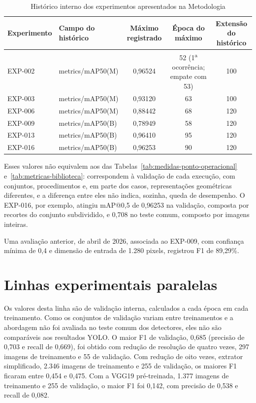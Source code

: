 \begin{table}[htb]
\centering
\caption{Hist\'orico interno dos experimentos apresentados na Metodologia}
\label{tab:historico-interno}
\small
\begin{tabular}{lp{3.2cm}ccc}
\hline
\textbf{Experimento} & \textbf{Campo do hist\'orico} & \textbf{M\'aximo registrado} & \textbf{\'Epoca do m\'aximo} & \textbf{Extens\~ao do hist\'orico} \\
\hline
EXP-002 & metrics/mAP50(M) & 0,96524 & 52 (1\textsuperscript{a} ocorr\^encia; empate com 53) & 100 \\
EXP-003 & metrics/mAP50(M) & 0,93120 & 63 & 100 \\
EXP-006 & metrics/mAP50(M) & 0,88442 & 68 & 120 \\
EXP-009 & metrics/mAP50(B) & 0,78949 & 58 & 120 \\
EXP-013 & metrics/mAP50(B) & 0,96410 & 95 & 120 \\
EXP-016 & metrics/mAP50(B) & 0,96253 & 90 & 120 \\
\hline
\end{tabular}
\end{table}

Esses valores n\~ao equivalem aos das Tabelas~\ref{tab:medidas-ponto-operacional} e~\ref{tab:metricas-biblioteca}: correspondem \`a valida\c{c}\~ao de cada execu\c{c}\~ao, com conjuntos, procedimentos e, em parte dos casos, representa\c{c}\~oes geom\'etricas diferentes, e a diferen\c{c}a entre eles n\~ao indica, sozinha, queda de desempenho. O EXP-016, por exemplo, atingiu mAP@0,5 de 0,96253 na valida\c{c}\~ao, composta por recortes do conjunto subdividido, e 0,708 no teste comum, composto por imagens inteiras.

Uma avalia\c{c}\~ao anterior, de abril de 2026, associada ao EXP-009, com confian\c{c}a m\'inima de 0,4 e dimens\~ao de entrada de 1.280 pixels, registrou F1 de 89,29\%.

\section{Linhas experimentais paralelas}
\label{sec:linhas-paralelas}

Os valores desta linha s\~ao de valida\c{c}\~ao interna, calculados a cada \'epoca em cada treinamento. Como os conjuntos de valida\c{c}\~ao variam entre treinamentos e a abordagem n\~ao foi avaliada no teste comum dos detectores, eles n\~ao s\~ao compar\'aveis aos resultados YOLO. O maior F1 de valida\c{c}\~ao, 0,685 (precis\~ao de 0,703 e recall de 0,669), foi obtido com redu\c{c}\~ao de resolu\c{c}\~ao de quatro vezes, 297 imagens de treinamento e 55 de valida\c{c}\~ao. Com redu\c{c}\~ao de oito vezes, extrator simplificado, 2.346 imagens de treinamento e 255 de valida\c{c}\~ao, os maiores F1 ficaram entre 0,454 e 0,475. Com a VGG19 pr\'e-treinada, 1.377 imagens de treinamento e 255 de valida\c{c}\~ao, o maior F1 foi 0,142, com precis\~ao de 0,538 e recall de 0,082.

